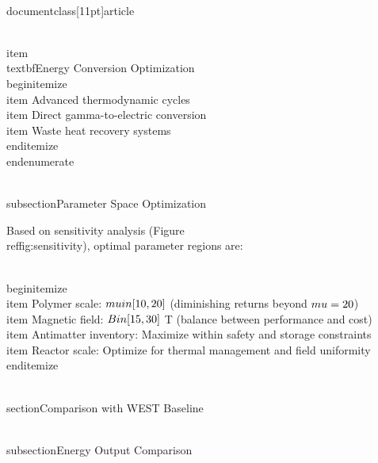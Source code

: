 \\documentclass[11pt]{article}
\begin{document}
    \\item \\textbf{Energy Conversion Optimization}
    \\begin{itemize}
        \\item Advanced thermodynamic cycles
        \\item Direct gamma-to-electric conversion
        \\item Waste heat recovery systems
    \\end{itemize}
\\end{enumerate}

\\subsection{Parameter Space Optimization}

Based on sensitivity analysis (Figure~\\ref{fig:sensitivity}), optimal parameter regions are:

\\begin{itemize}
    \\item Polymer scale: $\\mu \\in [10, 20]$ (diminishing returns beyond $\\mu = 20$)
    \\item Magnetic field: $B \\in [15, 30]$ T (balance between performance and cost)
    \\item Antimatter inventory: Maximize within safety and storage constraints
    \\item Reactor scale: Optimize for thermal management and field uniformity
\\end{itemize}

\\section{Comparison with WEST Baseline}

\\subsection{Energy Output Comparison}
\end{document}
